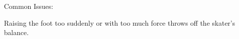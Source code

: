 


Common Issues:

Raising the foot too suddenly or with too much force throws off the skater's balance.    
